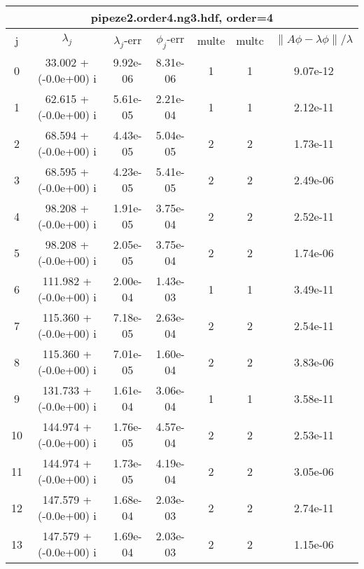 \begin{table}[H]\tableFont %
\begin{center}
\begin{tabular}{|c|c|c|c|c|c|c|}  \hline
\multicolumn{7}{|c|}{pipeze2.order4.ng3.hdf, order=4} \\ \hline
   j    &         $\lambda_j$        & $\lambda_j$-err  & $\phi_j$-err  & multe & multc & $\| A\phi - \lambda\phi\|/\lambda$     \\ \hline
     0  &     33.002 + (-0.0e+00) i  &    9.92e-06      &   8.31e-06    &   1    &  1   &    9.07e-12 \\
     1  &     62.615 + (-0.0e+00) i  &    5.61e-05      &   2.21e-04    &   1    &  1   &    2.12e-11 \\
     2  &     68.594 + (-0.0e+00) i  &    4.43e-05      &   5.04e-05    &   2    &  2   &    1.73e-11 \\
     3  &     68.595 + (-0.0e+00) i  &    4.23e-05      &   5.41e-05    &   2    &  2   &    2.49e-06 \\
     4  &     98.208 + (-0.0e+00) i  &    1.91e-05      &   3.75e-04    &   2    &  2   &    2.52e-11 \\
     5  &     98.208 + (-0.0e+00) i  &    2.05e-05      &   3.75e-04    &   2    &  2   &    1.74e-06 \\
     6  &    111.982 + (-0.0e+00) i  &    2.00e-04      &   1.43e-03    &   1    &  1   &    3.49e-11 \\
     7  &    115.360 + (-0.0e+00) i  &    7.18e-05      &   2.63e-04    &   2    &  2   &    2.54e-11 \\
     8  &    115.360 + (-0.0e+00) i  &    7.01e-05      &   1.60e-04    &   2    &  2   &    3.83e-06 \\
     9  &    131.733 + (-0.0e+00) i  &    1.61e-04      &   3.06e-04    &   1    &  1   &    3.58e-11 \\
    10  &    144.974 + (-0.0e+00) i  &    1.76e-05      &   4.57e-04    &   2    &  2   &    2.53e-11 \\
    11  &    144.974 + (-0.0e+00) i  &    1.73e-05      &   4.19e-04    &   2    &  2   &    3.05e-06 \\
    12  &    147.579 + (-0.0e+00) i  &    1.68e-04      &   2.03e-03    &   2    &  2   &    2.74e-11 \\
    13  &    147.579 + (-0.0e+00) i  &    1.69e-04      &   2.03e-03    &   2    &  2   &    1.15e-06 \\

\end{tabular}
\end{center}
\end{table}
